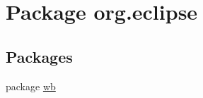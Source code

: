 \hypertarget{namespaceorg_1_1eclipse}{\section{Package org.\-eclipse}
\label{namespaceorg_1_1eclipse}
}
\subsection*{Packages}
\begin{DoxyCompactItemize}
\item 
package \hyperlink{namespaceorg_1_1eclipse_1_1wb}{wb}
\end{DoxyCompactItemize}
